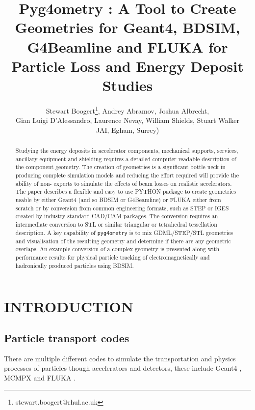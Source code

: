 \documentclass[a4paper,
               keeplastbox,   %
               ]{jacow}
\begin{document}
\title{Pyg4ometry : A Tool to Create Geometries for Geant4, BDSIM, G4Beamline and FLUKA for Particle Loss and Energy Deposit Studies}

\author{Stewart Boogert\thanks{stewart.boogert@rhul.ac.uk}, Andrey Abramov, Joshua Albrecht, \\ Gian Luigi D'Alessandro, Laurence Nevay, William Shields, Stuart Walker \\
JAI, Egham, Surrey)}
	
\maketitle

%
\begin{abstract}
Studying the energy deposits in accelerator components, mechanical supports, services, ancillary equipment and shielding requires a detailed computer readable description of the component geometry. The creation of geometries is a significant bottle neck in producing complete simulation models and reducing the effort required will provide the ability of non- experts to simulate the effects of beam losses on realistic accelerators. The paper describes a flexible and easy to use PYTHON package to create geometries usable by either Geant4 (and so BDSIM or G4Beamline) or FLUKA either from scratch or by conversion from common engineering formats, such as STEP or IGES created by industry standard CAD/CAM packages. The conversion requires an intermediate conversion to STL or similar triangular or tetrahedral tessellation description. A key capability of \verb|pyg4ometry| is to mix GDML/STEP/STL geometries and visualisation of the resulting geometry and determine if there are any geometric overlaps. An example conversion of a complex geometry is presented along with performance results for physical particle tracking of electromagnetically and hadronically produced particles using BDSIM.
\end{abstract}


\section{INTRODUCTION}

\subsection{Particle transport codes}
There are multiple different codes to simulate the transportation and physics processes of particles though accelerators and detectors, these include Geant4 \cite{geant4}, MCMPX and FLUKA \cite{fluka}. 
\end{document}
